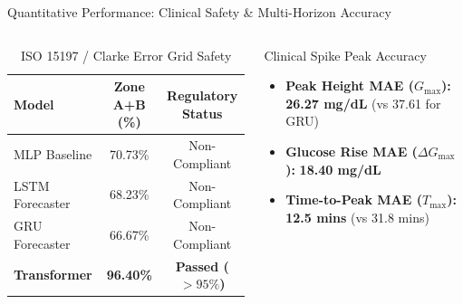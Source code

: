 \documentclass[10pt,aspectratio=169]{beamer}
\begin{document}
\begin{frame}{Quantitative Performance: Clinical Safety \& Multi-Horizon Accuracy}
    \begin{columns}
        \small
        \begin{table}
        \centering
        \caption{ISO 15197 / Clarke Error Grid Safety}
        \begin{tabular}{lcc}
            \toprule
            \rowcolor{RedHeader} \color{white}\textbf{Model} & \color{white}\textbf{Zone A+B (\%)} & \color{white}\textbf{Regulatory Status} \\
            \midrule
            MLP Baseline & 70.73\% & Non-Compliant \\
            LSTM Forecaster & 68.23\% & Non-Compliant \\
            GRU Forecaster & 66.67\% & Non-Compliant \\
            \rowcolor{RedLight}
            \textbf{Transformer} & \textbf{96.40\%} & \textcolor{GreenAccent}{\textbf{Passed ($>95\%$)}} \\
            \bottomrule
        \end{tabular}
        \end{table}
        
        \vspace{-0.2cm}
        \begin{block}{Clinical Spike Peak Accuracy}
            \justifying
            \small
            \begin{itemize}
                \item \textbf{Peak Height MAE ($G_{\max}$):} \textbf{26.27 mg/dL} (vs 37.61 for GRU)
                \item \textbf{Glucose Rise MAE ($\Delta G_{\max}$):} \textbf{18.40 mg/dL}
                \item \textbf{Time-to-Peak MAE ($T_{\max}$):} \textbf{12.5 mins} (vs 31.8 mins)
            \end{itemize}
        \end{block}


\end{columns}
\end{frame}
\end{document}
